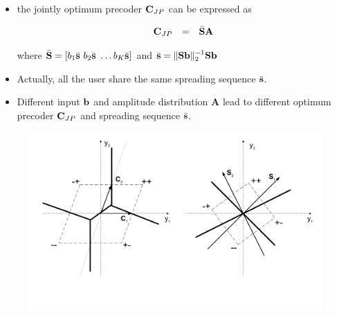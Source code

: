 \documentclass[20pt,landscape]{foils}
\newcommand{\bA}{{\mathbf A}}
\newcommand{\bb}{{\bf b}}
\newcommand{\bC}{{\bf C}}
\newcommand{\bs}{{\bf s}}
\newcommand{\bS}{{\bf S}}
\begin{document}
\begin{itemize}

\item the jointly optimum precoder $\bC_{JP}$ can be expressed as

$$
\begin{array}{rcl}
\bC_{JP}&=&\bar{\bS}\bA
\end{array}
$$

\noindent where $\bar{\bS}=[b_1\bar\bs\ b_2\bar\bs\ \ldots
b_K\bar\bs]$ and $\bar{\bs}=\|\bS\bb\|_2^{-1}\bS\bb$

\item Actually, all the user share the same spreading sequence
$\bar{\bs}$.

\item Different input $\bb$ and amplitude distribution $\bA$ lead
to different optimum precoder $\bC_{JP}$ and spreading sequence
$\bar{\bs}$.

\end{itemize}


\begin{figure}
\begin{center}
\includegraphics[width=8.0in]{JP_DecisionRegs.pdf}
\end{center}
\end{figure}
\end{document}

